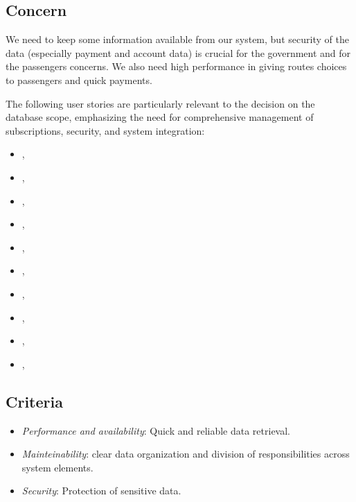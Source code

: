 \subsection*{Concern}
We need to keep some information available from our system, but security of the data (especially payment and account data) is crucial for the government and for the passengers concerns.
We also need high performance in giving routes choices to passengers and quick payments.

The following user stories are particularly relevant to the decision on the database scope, emphasizing the need for comprehensive management of subscriptions, security, and system integration:

\begin{itemize}[noitemsep]
    \item \userStoryOne, 
    \item \userStoryTwo,
    \item \userStoryThree,
    \item \userStoryFour,
    \item \userStoryFive,
    \item \userStorySix,
    \item \userStorySixteen,
    \item \userStoryEighteen,
    \item \userStoryTwentyThree,
    \item \userStoryTwentySeven,
\end{itemize}

\subsection*{Criteria}
\begin{itemize}
    \item \textit{Performance and availability}: Quick and reliable data retrieval.
    \item \textit{Mainteinability}: clear data organization and division of responsibilities across system elements.
    \item \textit{Security}: Protection of sensitive data.
\end{itemize}

